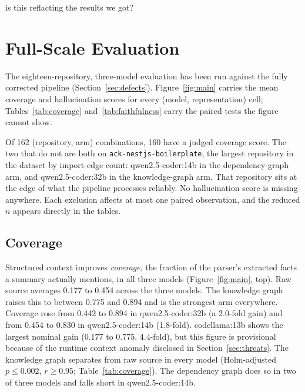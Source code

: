 is this reflacting the results we got?\documentclass[conference]{IEEEtran}
\begin{document}
\section{Full-Scale Evaluation}
\label{sec:results}

The eighteen-repository, three-model evaluation has been run against the fully corrected
pipeline (Section~\ref{sec:defects}). Figure~\ref{fig:main} carries the mean coverage and
hallucination scores for every (model, representation) cell;
Tables~\ref{tab:coverage} and~\ref{tab:faithfulness} carry the paired tests the figure cannot
show.

Of 162 (repository, arm) combinations, 160 have a judged coverage score. The two that do not are
both on \texttt{ack-nestjs-boilerplate}, the largest repository in the dataset by import-edge
count: qwen2.5-coder:14b in the dependency-graph arm, and qwen2.5-coder:32b in the
knowledge-graph arm. That repository sits at the edge of what the pipeline processes reliably.
No hallucination score is missing anywhere. Each exclusion affects at most one paired
observation, and the reduced $n$ appears directly in the tables.

\subsection{Coverage}
Structured context improves \emph{coverage}, the fraction of the parser's extracted facts a
summary actually mentions, in all three models (Figure~\ref{fig:main}, top). Raw source averages
0.177 to 0.454 across the three models. The knowledge graph raises this to between 0.775 and
0.894 and is the strongest arm everywhere. Coverage rose from 0.442 to 0.894 in
qwen2.5-coder:32b (a 2.0-fold gain) and from 0.454 to 0.830 in qwen2.5-coder:14b (1.8-fold).
codellama:13b shows the largest nominal gain (0.177 to 0.775, 4.4-fold), but this figure is
provisional because of the runtime context anomaly disclosed in Section~\ref{sec:threats}. The
knowledge graph separates from raw source in every model (Holm-adjusted $p\le0.002$,
$r\ge0.95$; Table~\ref{tab:coverage}). The dependency graph does so in two of three models and
falls short in qwen2.5-coder:14b.
\end{document}
